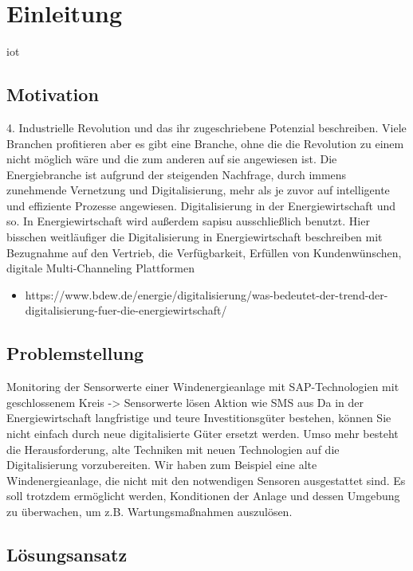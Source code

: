 \section{Einleitung}

\ac{iot}

\subsection{Motivation}
4. Industrielle Revolution und das ihr zugeschriebene Potenzial beschreiben. Viele Branchen profitieren aber es gibt eine Branche,
ohne die die Revolution zu einem nicht möglich wäre und die zum anderen auf sie angewiesen ist.
Die Energiebranche ist aufgrund der steigenden Nachfrage, durch immens zunehmende Vernetzung und Digitalisierung, mehr als je zuvor auf intelligente und effiziente Prozesse angewiesen.
Digitalisierung in der Energiewirtschaft und so. In Energiewirtschaft wird außerdem \ac{sapisu} ausschließlich benutzt.
Hier bisschen weitläufiger die Digitalisierung in Energiewirtschaft beschreiben mit Bezugnahme auf den Vertrieb,
die Verfügbarkeit, Erfüllen von Kundenwünschen, digitale Multi-Channeling Plattformen

\begin{itemize}
  \item https://www.bdew.de/energie/digitalisierung/was-bedeutet-der-trend-der-digitalisierung-fuer-die-energiewirtschaft/
\end{itemize}

\subsection{Problemstellung}
Monitoring der Sensorwerte einer Windenergieanlage mit SAP-Technologien mit geschlossenem Kreis -> Sensorwerte lösen Aktion wie SMS aus
\newline
Da in der Energiewirtschaft langfristige und teure Investitionsgüter bestehen, können Sie nicht einfach durch neue
digitalisierte Güter ersetzt werden. Umso mehr besteht die Herausforderung, alte Techniken mit neuen Technologien
auf die Digitalisierung vorzubereiten. Wir haben zum Beispiel eine alte Windenergieanlage, die nicht mit den
notwendigen Sensoren ausgestattet sind. Es soll trotzdem ermöglicht werden, Konditionen der Anlage und dessen Umgebung
zu überwachen, um z.B. Wartungsmaßnahmen auszulösen.

\subsection{Lösungsansatz}


